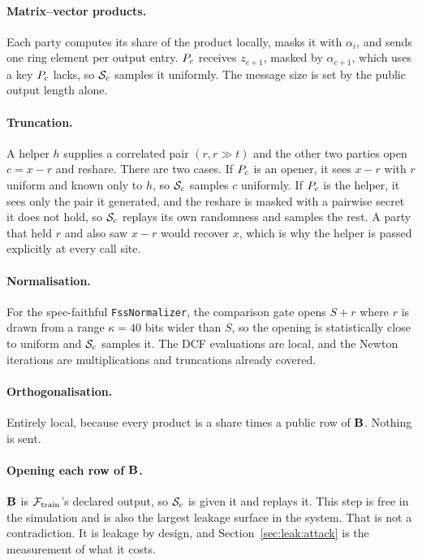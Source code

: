 \paragraph{Matrix--vector products.} Each party computes its share of the product
locally, masks it with $\alpha_i$, and sends one ring element per output entry.
$P_{c}$ receives $z_{c+1}$, masked by $\alpha_{c+1}$, which uses a key
$P_{c}$ lacks, so $\mathcal{S}_c$ samples it uniformly. The message size is set by
the public output length alone.

\paragraph{Truncation.} A helper $h$ supplies a correlated pair $(r, r \gg t)$
and the other two parties open $c = x - r$ and reshare. There are two cases. If
$P_{c}$ is an opener, it sees $x - r$ with $r$ uniform and known only to
$h$, so $\mathcal{S}_c$ samples $c$ uniformly. If $P_{c}$ is the helper, it sees
only the pair it generated, and the reshare is masked with a pairwise secret it
does not hold, so $\mathcal{S}_c$ replays its own randomness and samples the rest. A
party that held $r$ and also saw $x - r$ would recover $x$, which is why the
helper is passed explicitly at every call site.

\paragraph{Normalisation.} For the spec-faithful \texttt{FssNormalizer}, the
comparison gate opens $S + r$ where $r$ is drawn from a range $\kappa = 40$ bits
wider than $S$, so the opening is statistically close to uniform and $\mathcal{S}_c$
samples it. The DCF evaluations are local, and the Newton iterations are
multiplications and truncations already covered.

\paragraph{Orthogonalisation.} Entirely local, because every product is a share
times a public row of $\mathbf{B}$. Nothing is sent.

\paragraph{Opening each row of $\mathbf{B}$.} $\mathbf{B}$ is $\mathcal{F}_{\mathrm{train}}$'s
declared output, so $\mathcal{S}_c$ is given it and replays it. This step is free in the
simulation and is also the largest leakage surface in the system. That is not a
contradiction. It is leakage by design, and Section~\ref{sec:leak:attack} is the
measurement of what it costs.

